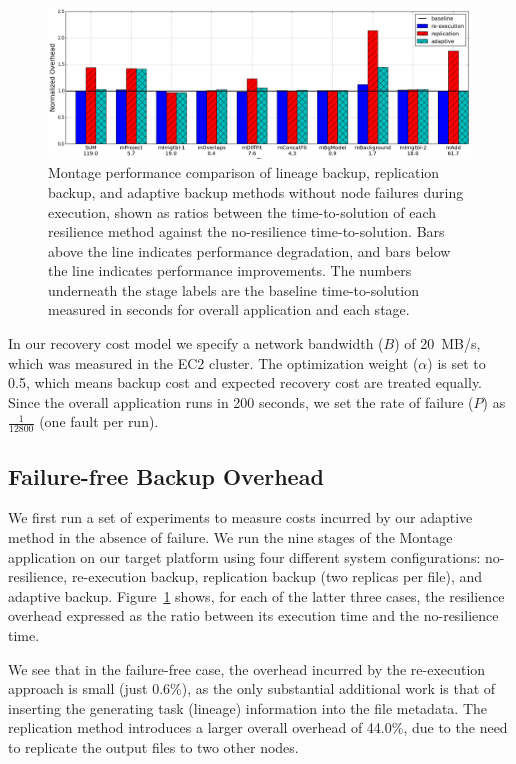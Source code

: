 \documentclass{sig-alternate}
\begin{document}
\begin{figure}[ht]
	\begin{center}
		\includegraphics[width=160mm]{pictures/no-failure.png}
		\vspace{-10pt}
		\caption{Montage performance comparison of lineage backup, replication backup, and adaptive backup
		methods without node failures during execution, shown as ratios between the time-to-solution 
		of each resilience method against the no-resilience time-to-solution. Bars above the line indicates performance degradation,
		and bars below the line indicates performance improvements. The numbers underneath the stage labels are the baseline time-to-solution measured in seconds for overall application and each stage.
		\label{fig:montage}}
  	\end{center}
\end{figure}

In our recovery cost model we specify a network bandwidth ($B$) of 20~MB/s, which was measured in the EC2 cluster. The optimization weight ($\alpha$) is set to 0.5, which means backup cost and expected recovery cost are treated equally. Since the overall application runs in 200 seconds, we set the rate of failure ($P$) as $\frac{1}{12800}$ (one fault per run).


\subsection{Failure-free Backup Overhead}
We first run a set of experiments to measure costs incurred by our adaptive method in the absence of failure.
We run the nine stages
of the Montage application on our target platform using four different system configurations: no-resilience, re-execution backup,
replication backup (two replicas per file), and adaptive backup.
Figure~\ref{fig:montage} shows, for each of the latter three cases, the resilience overhead expressed as
the ratio between its execution time and the no-resilience time.

We see that in the failure-free case, the overhead incurred by the re-execution approach is small (just 0.6\%),
as the only substantial additional work is that of inserting the generating task (lineage) information into the file metadata.
The replication method introduces a larger overall overhead of 44.0\%, due to the need to replicate the output files
to two other nodes.
\end{document}
